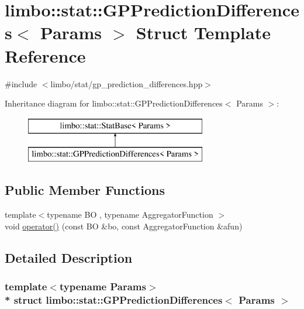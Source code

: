 \hypertarget{structlimbo_1_1stat_1_1_g_p_prediction_differences}{}\section{limbo\+:\+:stat\+:\+:G\+P\+Prediction\+Differences$<$ Params $>$ Struct Template Reference}
\label{structlimbo_1_1stat_1_1_g_p_prediction_differences}


{\ttfamily \#include $<$limbo/stat/gp\+\_\+prediction\+\_\+differences.\+hpp$>$}

Inheritance diagram for limbo\+:\+:stat\+:\+:G\+P\+Prediction\+Differences$<$ Params $>$\+:\begin{figure}[H]
\begin{center}
\leavevmode
\includegraphics[height=2.000000cm]{structlimbo_1_1stat_1_1_g_p_prediction_differences}
\end{center}
\end{figure}
\subsection*{Public Member Functions}
\begin{DoxyCompactItemize}
\item 
{\footnotesize template$<$typename BO , typename Aggregator\+Function $>$ }\\void \hyperlink{structlimbo_1_1stat_1_1_g_p_prediction_differences_a91a2d59457d83adbbfa6138db9e200cd}{operator()} (const BO \&bo, const Aggregator\+Function \&afun)
\end{DoxyCompactItemize}


\subsection{Detailed Description}
\subsubsection*{template$<$typename Params$>$\\*
struct limbo\+::stat\+::\+G\+P\+Prediction\+Differences$<$ Params $>$}

